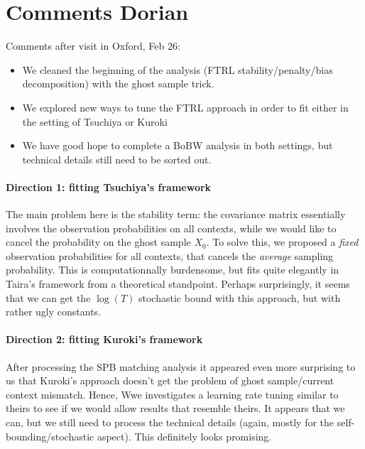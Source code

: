 \documentclass{article}
\theoremstyle{plain}
\theoremstyle{definition}
\theoremstyle{remark}
\begin{document}





\newpage
\appendix
\onecolumn


\section{Comments Dorian}

Comments after visit in Oxford, Feb 26:
\begin{itemize}
\item We cleaned the beginning of the analysis (FTRL stability/penalty/bias decomposition) with the ghost sample trick.
\item We explored new ways to tune the FTRL approach in order to fit either in the setting of Tsuchiya or Kuroki
\item We have good hope to complete a BoBW analysis in both settings, but technical details still need to be sorted out. 
\end{itemize}

\paragraph{Direction 1: fitting Tsuchiya's framework} The main problem here is the stability term: the covariance matrix essentially involves the observation probabilities on all contexts, while we would like to cancel the probability on the ghost sample $X_0$. To solve this, we proposed a \textit{fixed} observation probabilities for all contexts, that cancels the \textit{average} sampling probability. This is computationnally burdensome, but fits quite elegantly in Taira's framework from a theoretical standpoint. Perhaps surprisingly, it seems that we can get the $\log(T)$ stochastic bound with this approach, but with rather ugly constants.  

\paragraph{Direction 2: fitting Kuroki's framework} After processing the SPB matching analysis it appeared even more surprising to us that Kuroki's approach doesn't get the problem of ghost sample/current context mismatch. Hence, Wwe investigates a learning rate tuning similar to theirs to see if we would allow results that resemble theirs. It appears that we can, but we still need to process the technical details (again, mostly for the self-bounding/stochastic aspect). This definitely looks promising.
\end{document}
